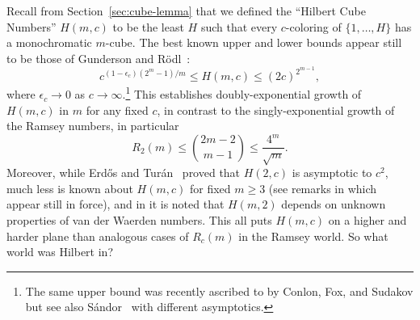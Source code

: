 \documentclass{article}
\theoremstyle{plain}
\theoremstyle{definition}
\renewcommand{\geq}{\geqslant}  %
\renewcommand{\leq}{\leqslant}  %
\begin{document}
Recall from Section~\ref{sec:cube-lemma} that
we defined the ``Hilbert Cube Numbers'' $H(m,c)$ to be the least $H$ such that
every $c$-coloring of $\{1,\dots,H\}$ has a monochromatic $m$-cube.
The best known upper and lower bounds appear still to be those of
Gunderson and R\"odl~\cite{GR}:
\[
c^{(1 - \epsilon_c)(2^m - 1)/m} \leq H(m,c) \leq (2c)^{2^{m-1}},
\]
where $\epsilon_c \to 0$ as $c \to \infty$.\footnote{%
The same upper bound was
recently ascribed to \cite{GRS2} by Conlon, Fox, and Sudakov
\cite{CFS} but see also S\'andor~\cite{sandor} with different
asymptotics.
} %
%
This establishes doubly-exponential growth of $H(m,c)$ in $m$ for any fixed $c$, in
contrast to the singly-exponential growth of the Ramsey numbers, in particular
\[
R_2(m) \leq \binom{2m-2}{m-1} \leq \frac{4^m}{\sqrt{m}}.
\]
Moreover, while Erd\H{o}s and Tur\'an~\cite{et} proved that $H(2,c)$
is asymptotic to $c^2$, much less is known about $H(m,c)$ for fixed $m \geq 3$ 
(see remarks in \cite{BCEG} which appear still in force), and in
\cite{CFS} it is noted that $H(m,2)$ depends on unknown properties of van
der Waerden numbers.  This all puts $H(m,c)$ on a higher and harder plane
than analogous cases of $R_c(m)$ in the Ramsey world.  So what world was Hilbert in?




\end{document}
